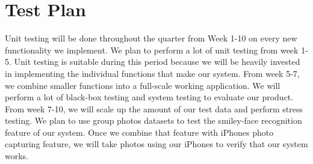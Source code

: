 \chapter{Test Plan}
Unit testing will be done throughout the quarter from Week 1-10 on every new functionality we implement. We plan to perform a lot of unit testing from week 1-5. Unit testing is suitable during this period because we will be heavily invested in implementing the individual functions that make our system. From week 5-7, we combine smaller functions into a full-scale working application. We will perform a lot of black-box testing and system testing to evaluate our product. From week 7-10, we will scale up the amount of our test data and perform stress testing. We plan to use group photos datasets to test the smiley-face recognition feature of our system. Once we combine that feature with iPhones photo capturing feature, we will take photos using our iPhones to verify that our system works.

